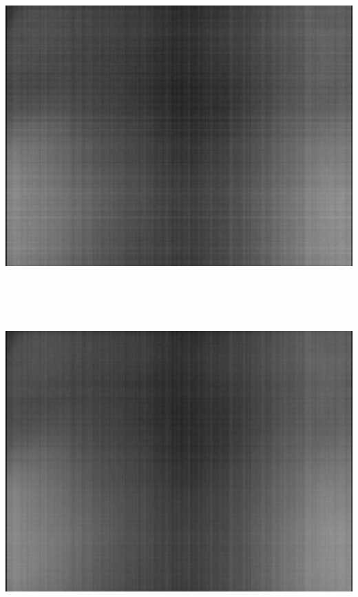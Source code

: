 \begin{center}
\includegraphics[height=12cm]{images/blackframes-gainx1-offset2047-5ms-01}
\end{center}

\begin{center}
\includegraphics[height=12cm]{images/darkavg-5ms}
\end{center}

